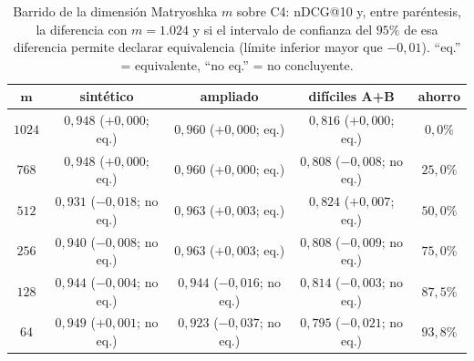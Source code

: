 \begin{table}[htbp]
\centering
\footnotesize
\setlength{\tabcolsep}{5pt}
\renewcommand{\arraystretch}{1.25}
\caption{Barrido de la dimensión Matryoshka $m$ sobre C4: nDCG@10 y, entre paréntesis, la diferencia con $m=1.024$ y si el intervalo de confianza del $95\%$ de esa diferencia permite declarar equivalencia (límite inferior mayor que $-0{,}01$). ``eq.'' = equivalente, ``no eq.'' = no concluyente.}
\label{tab:matryoshka}
\begin{tabularx}{\textwidth}{@{}c C C C c@{}}
\toprule
$\boldsymbol{m}$ & \textbf{sintético} & \textbf{ampliado} & \textbf{difíciles A+B} & \textbf{ahorro} \\
\midrule
$1024$ & $0{,}948$ ($+0{,}000$; eq.) & $0{,}960$ ($+0{,}000$; eq.) & $0{,}816$ ($+0{,}000$; eq.) & $0{,}0\%$ \\
$768$ & $0{,}948$ ($+0{,}000$; eq.) & $0{,}960$ ($+0{,}000$; eq.) & $0{,}808$ ($-0{,}008$; no eq.) & $25{,}0\%$ \\
$512$ & $0{,}931$ ($-0{,}018$; no eq.) & $0{,}963$ ($+0{,}003$; eq.) & $0{,}824$ ($+0{,}007$; eq.) & $50{,}0\%$ \\
$256$ & $0{,}940$ ($-0{,}008$; no eq.) & $0{,}963$ ($+0{,}003$; eq.) & $0{,}808$ ($-0{,}009$; no eq.) & $75{,}0\%$ \\
$128$ & $0{,}944$ ($-0{,}004$; no eq.) & $0{,}944$ ($-0{,}016$; no eq.) & $0{,}814$ ($-0{,}003$; no eq.) & $87{,}5\%$ \\
$64$ & $0{,}949$ ($+0{,}001$; no eq.) & $0{,}923$ ($-0{,}037$; no eq.) & $0{,}795$ ($-0{,}021$; no eq.) & $93{,}8\%$ \\
\bottomrule
\end{tabularx}
\end{table}

